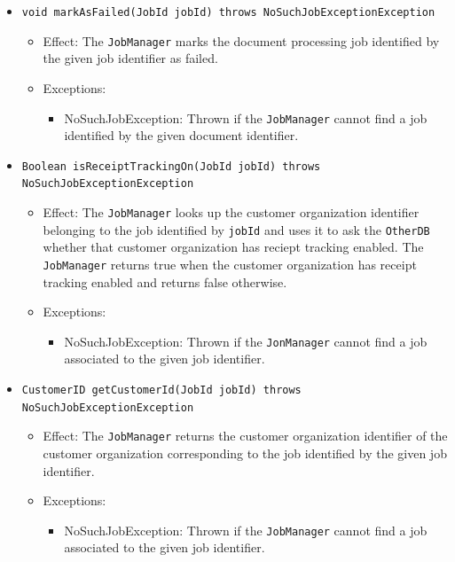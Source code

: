 \documentclass[a4paper,10pt]{article}
\begin{document}
\begin{itemize}
\begin{itemize}
  \item \texttt{void markAsFailed(JobId jobId) throws NoSuchJobExceptionException}
    	\begin{itemize}
    		\item Effect: The \texttt{JobManager} marks the document processing job identified by the given job identifier as failed.
    		\item Exceptions:
    		\begin{itemize}
    			\item NoSuchJobException: Thrown if the \texttt{JobManager} cannot find a job identified by the given document identifier.
    		\end{itemize}
    	\end{itemize}        	
    	
    	
    	\item \texttt{Boolean isReceiptTrackingOn(JobId jobId) throws NoSuchJobExceptionException}
    	\begin{itemize}
    		\item Effect: The \texttt{JobManager} looks up the customer organization identifier belonging to the job identified by \texttt{jobId} and uses it to ask the \texttt{OtherDB} whether that customer organization has reciept tracking enabled. The \texttt{JobManager} returns true when the customer organization has receipt tracking enabled and returns false otherwise.
    		\item Exceptions:
    		\begin{itemize}
    			\item NoSuchJobException: Thrown if the \texttt{JonManager} cannot find a job associated to the given job identifier.
    		\end{itemize}
    	\end{itemize}
  
   	   \item \texttt{CustomerID getCustomerId(JobId jobId) throws NoSuchJobExceptionException}
    	\begin{itemize}
    		\item Effect: The \texttt{JobManager} returns the customer organization identifier of the customer organization corresponding to the job identified by the given job identifier.
    		\item Exceptions:
    		\begin{itemize}
    			\item NoSuchJobException: Thrown if the \texttt{JobManager} cannot find a job associated to the given job identifier.
    		\end{itemize}
    	\end{itemize}	  
    	

\end{itemize}
\end{itemize}
\end{document}
